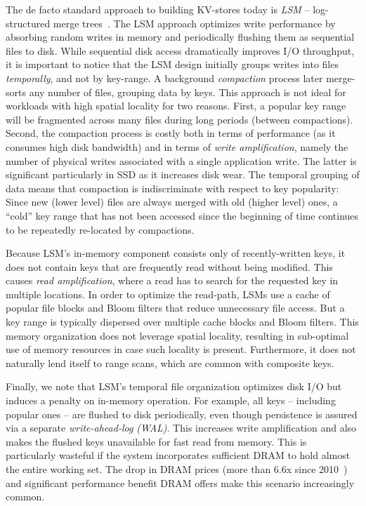 The de facto standard approach to building KV-stores today is \emph{LSM} -- log-structured merge trees~\cite{O'Neil1996}. 
The LSM approach optimizes write performance by absorbing random writes in memory and periodically flushing 
them as sequential files to disk. While  sequential disk access dramatically improves I/O throughput, it 
is important to notice that the LSM design initially groups writes  into files \emph{temporally}, and not by key-range. 
A background \emph{compaction} process later merge-sorts any number of files, grouping data by keys. 
This approach is not ideal for workloads with high spatial locality for two reasons. 
First, a popular key range will be fragmented across many files during long periods (between compactions). 
Second, the compaction process is costly both in terms of performance 
(as it consumes high disk bandwidth) and in terms of \emph{write amplification}, namely the number of physical writes 
associated with a single application write. The latter is significant particularly in SSD as it increases disk wear. 
The temporal grouping of data means that compaction is indiscriminate with respect to key popularity:  
Since new (lower level) files are always merged with old (higher level) ones, 
a ``cold'' key range that has not been accessed since the  beginning of time continues to be repeatedly re-located
by  compactions.  

Because LSM's in-memory component consists only of recently-written keys, 
it does not contain keys that are frequently read without being modified. 
This causes \emph{read amplification}, where a read has to search for the 
requested key in multiple locations. 
In order to optimize the read-path, LSMs  use a cache of popular file blocks and 
Bloom filters that reduce unnecessary file access. 
But  a key range is typically dispersed over multiple cache blocks and Bloom filters. 
This memory organization does not leverage spatial locality, 
resulting in sub-optimal use of memory resources in case such locality is present.
Furthermore, it does not naturally lend itself to range scans,
which are common with composite keys.

Finally, we note that LSM's temporal file organization optimizes disk I/O but induces a penalty on in-memory operation. 
For example, all keys -- including popular ones -- are flushed to disk periodically, even though persistence is assured 
via a separate \emph{write-ahead-log (WAL)}. 
This increases write amplification and also makes the flushed keys unavailable for fast read from memory. 
This is particularly wasteful if the system incorporates sufficient DRAM to hold almost the entire working set. 
The drop in DRAM prices (more than $6.6$x since 2010~\cite{dram-prices})  and 
significant performance benefit DRAM offers make this scenario increasingly common.  

